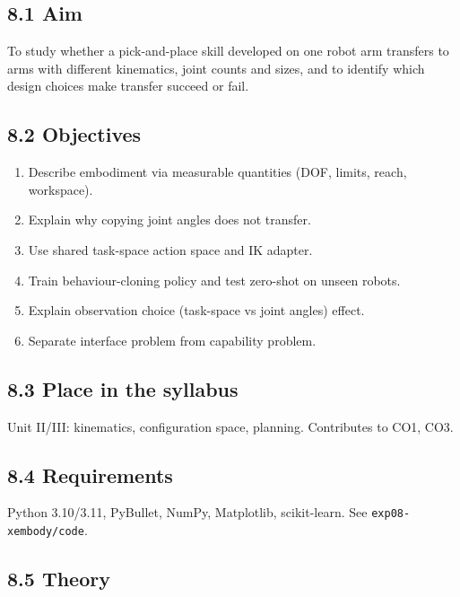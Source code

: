 \documentclass[
]{article}
\providecommand{\tightlist}{%
  \setlength{\itemsep}{0pt}\setlength{\parskip}{0pt}}
\begin{document}
\subsection{8.1 Aim}\label{aim-7}

To study whether a pick-and-place skill developed on one robot arm
transfers to arms with different kinematics, joint counts and sizes, and
to identify which design choices make transfer succeed or fail.

\subsection{8.2 Objectives}\label{objectives-7}

\begin{enumerate}
\def\labelenumi{\arabic{enumi}.}
\tightlist
\item
  Describe embodiment via measurable quantities (DOF, limits, reach,
  workspace).
\item
  Explain why copying joint angles does not transfer.
\item
  Use shared task-space action space and IK adapter.
\item
  Train behaviour-cloning policy and test zero-shot on unseen robots.
\item
  Explain observation choice (task-space vs joint angles) effect.
\item
  Separate interface problem from capability problem.
\end{enumerate}

\subsection{8.3 Place in the syllabus}\label{place-in-the-syllabus-7}

Unit II/III: kinematics, configuration space, planning. Contributes to
CO1, CO3.

\subsection{8.4 Requirements}\label{requirements-7}

Python 3.10/3.11, PyBullet, NumPy, Matplotlib, scikit-learn. See
\texttt{exp08-xembody/code}.

\subsection{8.5 Theory}\label{theory-7}
\end{document}
